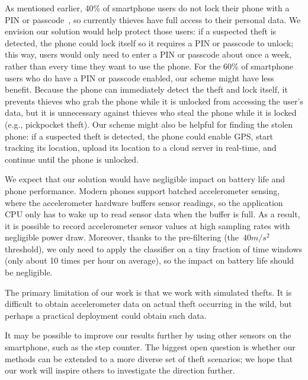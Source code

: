 As mentioned earlier, 40\% of smartphone users do not lock their phone with a PIN or passcode~\cite{egelman:lock}, so currently thieves have full access to their personal data.
We envision our solution would help protect those users: if a suspected theft is detected, the phone could lock itself so it requires a PIN or passcode to unlock; this way, users would only need to enter a PIN or passcode about once a week, rather than every time they want to use the phone.
For the 60\% of smartphone users who do have a PIN or passcode enabled, our scheme might have less benefit.
Because the phone can immediately detect the theft and lock itself, it prevents thieves who grab the phone while it is unlocked from accessing the user's data, but it is unnecessary against thieves who steal the phone while it is locked (e.g., pickpocket theft).
Our scheme might also be helpful for finding the stolen phone: if a suspected theft is detected, the phone could enable GPS, start tracking its location, upload its location to a cloud server in real-time, and continue until the phone is unlocked.

We expect that our solution would have negligible impact on battery life and phone performance.
Modern phones support batched accelerometer sensing, where the accelerometer hardware buffers sensor readings, so the application CPU only has to wake up to read sensor data when the buffer is full.
As a result, it is possible to record accelerometer sensor values at high sampling rates with negligible power draw.
Moreover, thanks to the pre-filtering (the~$40 m/s^2$ threshold),
we only need to apply the classifier on a tiny fraction of time windows (only about 10 times per hour on average),
so the impact on battery life should be negligible.

The primary limitation of our work is that we work with simulated thefts.
It is difficult to obtain accelerometer data on actual theft occurring in the wild, but perhaps a practical deployment could obtain such data.

It may be possible to improve our results further by using other sensors on the smartphone, such as the step counter.
The biggest open question is whether our methods can be extended to a more diverse set of theft scenarios; we hope that our work will inspire others to investigate the direction further.




